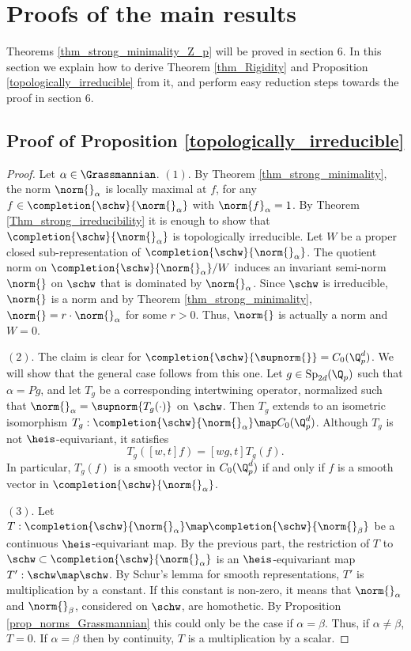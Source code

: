 \section{Proofs of the main results}
Theorems \ref{thm_strong_minimality_Z_p} will be proved in section $6$.
In this section we explain how to derive Theorem \ref{thm_Rigidity} and Proposition \ref{topologically_irreducible} from it, and perform easy reduction steps towards the proof in section $6$.

\subsection{Proof of Proposition \ref{topologically_irreducible}}

    \begin{proof}
    Let $\alpha\in\Grassmannian$.
    $(1)$. By Theorem \ref{thm_strong_minimality}, the norm $\norm{}_\alpha$ is locally maximal at $f$, for any $f\in \completion{\schw}{\norm{}_\alpha}$ with $\norm{f}_\alpha=1$.
    By Theorem \ref{Thm_strong_irreducibility} it is enough to show that $\completion{\schw}{\norm{}_\alpha}$ is topologically irreducible.
    Let $W$ be a proper closed sub-representation of $\completion{\schw}{\norm{}_\alpha}$.
    The quotient norm  on $\completion{\schw}{\norm{}_\alpha}/W$ induces an invariant semi-norm $\norm{}$ on $\schw$ that is dominated by $\norm{}_\alpha$.
    Since $\schw$ is irreducible, $\norm{}$ is a norm and by Theorem \ref{thm_strong_minimality}, $\norm{}=r\cdot \norm{}_\alpha$ for some $r>0$.
    Thus, $\norm{}$ is actually a norm and $W=0$.
    
    $(2)$. The claim is clear for $\completion{\schw}{\supnorm{}}=C_0(\Q_p^d)$.
    We will show that the general case follows from this one.
    Let $g\in \mathrm{Sp}_{2d}(\Q_p)$ such that $\alpha=Pg$, and let $T_g$ be a corresponding intertwining operator, normalized such that $\norm{}_\alpha=\supnorm{T_g(\cdot )}$ on $\schw$.
    Then $T_g$ extends to an isometric isomorphism $T_g:\completion{\schw}{\norm{}_\alpha}\map C_0(\Q_p^d)$.
    Although $T_g$ is not $\heis$-equivariant, it satisfies 
    \[T_g([w,t]f)=[wg,t]T_g(f).\]
    In particular, $T_g(f)$ is a smooth vector in $C_0(\Q_p^d)$ if and only if $f$ is a smooth vector in $\completion{\schw}{\norm{}_\alpha}$.
    
    $(3).$ Let $T:\completion{\schw}{\norm{}_\alpha}\map\completion{\schw}{\norm{}_\beta}$ be a continuous $\heis$-equivariant map.
    By the previous part, the restriction of $T$ to $\schw\subset \completion{\schw}{\norm{}_\alpha}$ is an $\heis$-equivariant map $T':\schw\map \schw$.
    By Schur's lemma for smooth representations, $T'$ is multiplication by a constant.
    If this constant is non-zero, it means that $\norm{}_\alpha$ and $\norm{}_\beta$, considered on $\schw$, are homothetic.
    By Proposition \ref{prop_norms_Grassmannian} this could only be the case if $\alpha=\beta$.
    Thus, if $\alpha\neq \beta$, $T=0$.
    If $\alpha=\beta$ then by continuity, $T$ is a multiplication by a scalar.
    \end{proof}
    
